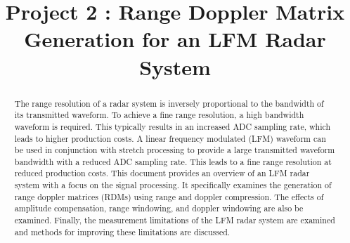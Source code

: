 \documentclass[conference]{IEEEtran}
\begin{document}
\title{Project 2 : Range Doppler Matrix Generation for an LFM Radar System}

\author{
}
\maketitle

\begin{abstract}
The range resolution of a radar system is inversely proportional to the bandwidth of its transmitted waveform. To achieve a fine range resolution, a high bandwidth waveform is required. This typically results in an increased ADC sampling rate, which leads to higher production costs. A linear frequency modulated (LFM) waveform can be used in conjunction with stretch processing to provide a large transmitted waveform bandwidth with a reduced ADC sampling rate. This leads to a fine range resolution at reduced production costs. This document provides an overview of an LFM radar system with a focus on the signal processing. It specifically examines the generation of range doppler matrices (RDMs) using range and doppler compression. The effects of amplitude compensation, range windowing, and doppler windowing are also be examined. Finally, the measurement limitations of the LFM radar system are examined and methods for improving these limitations are discussed. 
\end{abstract}

\begin{IEEEkeywords}
\end{IEEEkeywords}
\end{document}

